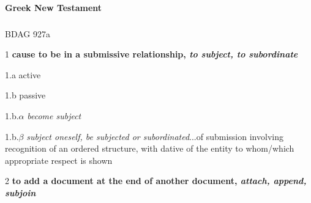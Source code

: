 			
			
		\paragraph{Greek New Testament} %
			\label{SUBDUE-GREEK}
		
			\subparagraph{\texorpdfstring{}{}}
				\label{HUPOTASSO}
			
				\begin{compactdesc}
					\item[BDAG 927a] \textbf{}
						\begin{compactitem}
							\item[1] \textbf{cause to be in a submissive relationship, \textit{to subject, to subordinate}}
							\item[1.a] active
							\item[1.b] passive
							\item[1.b.$\alpha$] \textit{become subject}
							\item[1.b.$\beta$] \textit{subject oneself, be subjected or subordinated}...of submission involving recognition of an ordered structure, with dative of the entity to whom/which appropriate respect is shown
							\item[2] \textbf{to add a document at the end of another document, \textit{attach, append, subjoin}}
						\end{compactitem}
				\end{compactdesc}
				
				
